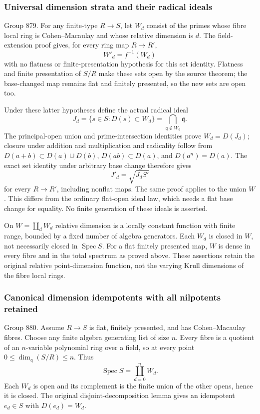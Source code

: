 \subsubsection{Universal dimension strata and their radical ideals}\label{universal-dimension-strata-and-their-radical-ideals}

Group 879. For any finite-type \(R\to S\), let \(W_d\) consist of the primes whose fibre local ring is Cohen--Macaulay and whose relative dimension is \(d\). The field-extension proof gives, for every ring map \(R\to R'\), \[
W'_d=f^{-1}(W_d)
\] with no flatness or finite-presentation hypothesis for this set identity. Flatness and finite presentation of \(S/R\) make these sets open by the source theorem; the base-changed map remains flat and finitely presented, so the new sets are open too.

Under these latter hypotheses define the actual radical ideal \[
J_d=\{s\in S:D(s)\subset W_d\}
    =\bigcap_{\mathfrak q\notin W_d}\mathfrak q .
\] The principal-open union and prime-intersection identities prove \(W_d=D(J_d)\); closure under addition and multiplication and radicality follow from \(D(a+b)\subset D(a)\cup D(b)\), \(D(ab)\subset D(a)\), and \(D(a^n)=D(a)\). The exact set identity under arbitrary base change therefore gives \[
J'_d=\sqrt{J_d S'}
\] for every \(R\to R'\), including nonflat maps. The same proof applies to the union \(W\). This differs from the ordinary flat-open ideal law, which needs a flat base change for equality. No finite generation of these ideals is asserted.

On \(W=\coprod_d W_d\) relative dimension is a locally constant function with finite range, bounded by a fixed number of algebra generators. Each \(W_d\) is closed in \(W\), not necessarily closed in \(\operatorname{Spec}S\). For a flat finitely presented map, \(W\) is dense in every fibre and in the total spectrum as proved above. These assertions retain the original relative point-dimension function, not the varying Krull dimensions of the fibre local rings.

\subsubsection{Canonical dimension idempotents with all nilpotents retained}\label{canonical-dimension-idempotents-with-all-nilpotents-retained}

Group 880. Assume \(R\to S\) is flat, finitely presented, and has Cohen--Macaulay fibres. Choose any finite algebra generating list of size \(n\). Every fibre is a quotient of an \(n\)-variable polynomial ring over a field, so at every point \(0\leq\dim_{\mathfrak q}(S/R)\leq n\). Thus \[
\operatorname{Spec}S=\coprod_{d=0}^n W_d .
\] Each \(W_d\) is open and its complement is the finite union of the other opens, hence it is closed. The original disjoint-decomposition lemma gives an idempotent \(e_d\in S\) with \(D(e_d)=W_d\).

